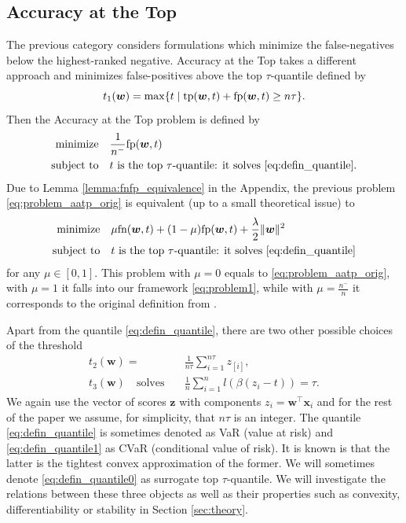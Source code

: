 \documentclass[]{interact}
\theoremstyle{plain}%
\theoremstyle{definition}
\theoremstyle{remark}
\let\originalleft\left
\let\originalright\right
\renewcommand{\left}{\mathopen{}\mathclose\bgroup\originalleft}
\renewcommand{\right}{\aftergroup\egroup\originalright}
\newcommand{\norm}[1]{\|#1\|}
\newcommand{\tp}{\textnormal{tp}}
\newcommand{\fp}{\textnormal{fp}}
\newcommand{\fn}{\textnormal{fn}}
\begin{document}
\subsection{Accuracy at the Top}\label{sec:obj2}

The previous category considers formulations which minimize the false-negatives below the highest-ranked negative. Accuracy at the Top \citep{boyd2012accuracy} takes a different approach and minimizes false-positives above the top $\tau$-quantile defined by
\begin{equation}\label{eq:defin_quantile} 
t_1(\bm w) = \max\left\{t\mid \tp(\bm w,t) + \fp(\bm w,t)\ge n\tau\right\}.
\end{equation}
Then the Accuracy at the Top problem is defined by
\begin{equation}\label{eq:problem_aatp_orig}
\aligned
{\rm minimize} & \quad \frac{1}{n^{-}}\fp(\bm w,t) \\
\textnormal{subject to} & \quad t\text{ is the top \ensuremath{\tau}-quantile: it solves }\eqref{eq:defin_quantile}.
\endaligned
\end{equation}
Due to Lemma \ref{lemma:fnfp_equivalence} in the Appendix, the previous problem \eqref{eq:problem_aatp_orig} is equivalent (up to a small theoretical issue) to
\begin{equation}\label{eq:problem_aatp}
\aligned
{\rm minimize} & \quad \mu\fn(\bm w,t) + (1-\mu)\fp(\bm w,t) + \frac{\lambda}{2}\norm{\bm w}^2\\
\textnormal{subject to} & \quad t\text{ is the top \ensuremath{\tau}-quantile: it solves }\eqref{eq:defin_quantile}
\endaligned
\end{equation}
for any $\mu\in[0,1]$. This problem with $\mu=0$ equals to \eqref{eq:problem_aatp_orig}, with $\mu=1$ it falls into our framework \eqref{eq:problem1}, while with $\mu=\frac{n^-}{n}$ it corresponds to the original definition from \cite{boyd2012accuracy}. 

Apart from the quantile \eqref{eq:defin_quantile}, there are two other possible choices of the threshold
\begin{align}
\label{eq:defin_quantile1}t_2(\bm w) =\ &\frac{1}{n\tau}\sum_{i=1}^{n\tau} z_{[i]}, \\
\label{eq:defin_quantile0} t_3(\bm w)\quad \text{solves} \quad &\frac1n\sum_{i=1}^nl(\beta(z_i-t)) = \tau.
\end{align}
We again use the vector of scores $\bm z$ with components $z_i=\bm w^\top \bm x_i$ and for the rest of the paper we assume, for simplicity, that $n\tau$ is an integer. The quantile \eqref{eq:defin_quantile} is sometimes denoted as VaR (value at risk) and \eqref{eq:defin_quantile1} as CVaR (conditional value of risk). It is known is that the latter is the tightest convex approximation of the former. We will sometimes denote \eqref{eq:defin_quantile0} as surrogate top $\tau$-quantile. We will investigate the relations between these three objects as well as their properties such as convexity, differentiability or stability in Section \ref{sec:theory}.
\end{document}
